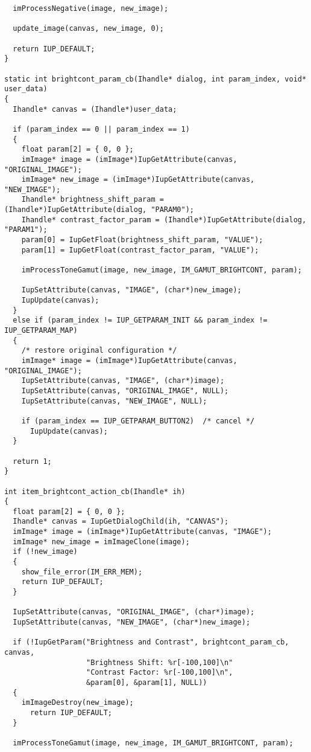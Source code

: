 \documentclass{ctexart}
\begin{document}
\begin{lstlisting}
  imProcessNegative(image, new_image);

  update_image(canvas, new_image, 0);

  return IUP_DEFAULT;
}

static int brightcont_param_cb(Ihandle* dialog, int param_index, void* user_data)
{
  Ihandle* canvas = (Ihandle*)user_data;

  if (param_index == 0 || param_index == 1)
  {
    float param[2] = { 0, 0 };
    imImage* image = (imImage*)IupGetAttribute(canvas, "ORIGINAL_IMAGE");
    imImage* new_image = (imImage*)IupGetAttribute(canvas, "NEW_IMAGE");
    Ihandle* brightness_shift_param = (Ihandle*)IupGetAttribute(dialog, "PARAM0");
    Ihandle* contrast_factor_param = (Ihandle*)IupGetAttribute(dialog, "PARAM1");
    param[0] = IupGetFloat(brightness_shift_param, "VALUE");
    param[1] = IupGetFloat(contrast_factor_param, "VALUE");

    imProcessToneGamut(image, new_image, IM_GAMUT_BRIGHTCONT, param);

    IupSetAttribute(canvas, "IMAGE", (char*)new_image);
    IupUpdate(canvas);
  }
  else if (param_index != IUP_GETPARAM_INIT && param_index != IUP_GETPARAM_MAP)
  {
    /* restore original configuration */
    imImage* image = (imImage*)IupGetAttribute(canvas, "ORIGINAL_IMAGE");
    IupSetAttribute(canvas, "IMAGE", (char*)image);
    IupSetAttribute(canvas, "ORIGINAL_IMAGE", NULL);
    IupSetAttribute(canvas, "NEW_IMAGE", NULL);

    if (param_index == IUP_GETPARAM_BUTTON2)  /* cancel */
      IupUpdate(canvas);
  }

  return 1;
}

int item_brightcont_action_cb(Ihandle* ih)
{
  float param[2] = { 0, 0 };
  Ihandle* canvas = IupGetDialogChild(ih, "CANVAS");
  imImage* image = (imImage*)IupGetAttribute(canvas, "IMAGE");
  imImage* new_image = imImageClone(image);
  if (!new_image)
  {
    show_file_error(IM_ERR_MEM);
    return IUP_DEFAULT;
  }

  IupSetAttribute(canvas, "ORIGINAL_IMAGE", (char*)image);
  IupSetAttribute(canvas, "NEW_IMAGE", (char*)new_image);

  if (!IupGetParam("Brightness and Contrast", brightcont_param_cb, canvas,
                   "Brightness Shift: %r[-100,100]\n"
                   "Contrast Factor: %r[-100,100]\n",
                   &param[0], &param[1], NULL))
  {
    imImageDestroy(new_image);
	  return IUP_DEFAULT;
  }

  imProcessToneGamut(image, new_image, IM_GAMUT_BRIGHTCONT, param);


\end{lstlisting}
\end{document}
